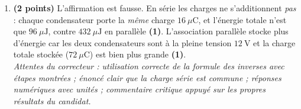 \documentclass[11pt]{article}
\begin{document}
\begin{corrige}
\begin{enumerate}
\item \textbf{(2 points)} L'affirmation est fausse. En série les charges ne s'additionnent \emph{pas} : chaque condensateur porte la \emph{même} charge $16\ \mu\mathrm{C}$, et l'énergie totale n'est que $96\ \mu\mathrm{J}$, contre $432\ \mu\mathrm{J}$ en parallèle \textbf{(1)}. L'association parallèle stocke plus d'énergie car les deux condensateurs sont à la pleine tension $12\ \mathrm{V}$ et la charge totale stockée ($72\ \mu\mathrm{C}$) est bien plus grande \textbf{(1)}.\\
\emph{Attentes du correcteur : utilisation correcte de la formule des inverses avec étapes montrées ; énoncé clair que la charge série est commune ; réponses numériques avec unités ; commentaire critique appuyé sur les propres résultats du candidat.}
\end{enumerate}
\end{corrige}
\end{document}

